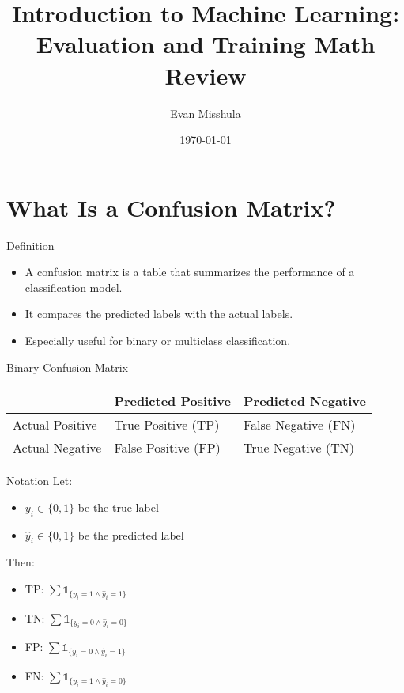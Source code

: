 \documentclass[aspectratio=169]{beamer}
\author{Evan Misshula}
\date{\today}
\title{Introduction to Machine Learning: Evaluation and Training Math Review}
\begin{document}
\maketitle

\section{What Is a Confusion Matrix?}
\label{sec:org27ef0b7}
\begin{frame}[label={sec:orgfbb8cd0}]{Definition}
\begin{itemize}
\item A \alert{confusion matrix} is a table that summarizes the performance of a classification model.
\item It compares the predicted labels with the actual labels.
\item Especially useful for binary or multiclass classification.
\end{itemize}
\end{frame}

\begin{frame}[label={sec:org384791a}]{Binary Confusion Matrix}
\begin{center}
\begin{tabular}{lll}
 & Predicted Positive & Predicted Negative\\[0pt]
\hline
Actual Positive & True Positive (TP) & False Negative (FN)\\[0pt]
Actual Negative & False Positive (FP) & True Negative (TN)\\[0pt]
\end{tabular}
\end{center}
\end{frame}

\begin{frame}[label={sec:org0912c6d}]{Notation}
Let:
\begin{itemize}
\item \(y_i \in \{0, 1\}\) be the true label
\item \(\hat{y}_i \in \{0, 1\}\) be the predicted label
\end{itemize}

Then:
\begin{itemize}
\item TP: \(\sum \mathds{1}_{\{y_i = 1 \wedge \hat{y}_i = 1\}}\)
\item TN: \(\sum \mathds{1}_{\{y_i = 0 \wedge \hat{y}_i = 0\}}\)
\item FP: \(\sum \mathds{1}_{\{y_i = 0 \wedge \hat{y}_i = 1\}}\)
\item FN: \(\sum \mathds{1}_{\{y_i = 1 \wedge \hat{y}_i = 0\}}\)
\end{itemize}
\end{frame}
\end{document}

